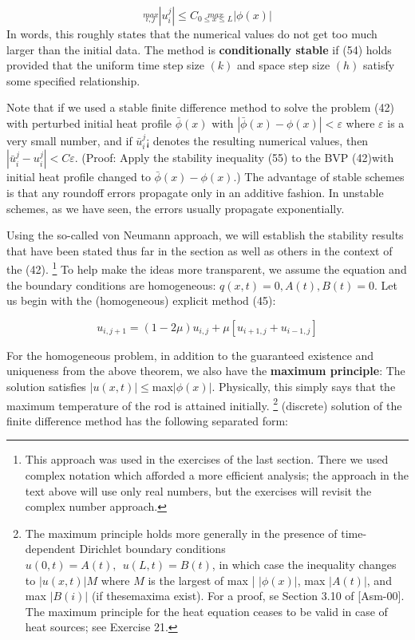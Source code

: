 \documentclass[../main.tex]{subfiles}
\begin{document}
\begin{equation}
 \stackrel{max}{_{i,j}} |u_i^j|\leqslant C \stackrel{max}{_{0\leqslant x \leqslant L}} |\phi(x)|
\end{equation}
In words, this roughly states that the numerical values do not get too much larger than the initial data. The method is \textbf{conditionally stable} if (54) holds provided that the uniform time step size $(k)$ and space step size $(h)$ satisfy some specified relationship.


Note that if we used a stable finite difference method to solve the problem (42) with perturbed initial heat profile $\bar{\phi}(x)$ with $|\bar{\phi}(x) - \phi(x)| < \varepsilon$ where $\varepsilon$ is a very small number, and if $ \bar{u}_i^j$¡ denotes the resulting numerical values, then $|\bar{u}_i^j-u_i^j|<C \varepsilon$. (Proof: Apply the stability inequality (55) to the BVP (42)with initial heat profile changed to $\bar{\phi}(x) - \phi(x)$.) The advantage of stable schemes is that any roundoff errors propagate only in an additive fashion. In unstable schemes, as we have seen, the errors usually propagate exponentially. 


Using the so-called von Neumann approach, we will establish the stability results that have been stated thus far in the section as well as others in the context of the (42).
\footnote{This approach was used in the exercises of the last section. There we used complex notation which afforded a more efficient analysis; the approach in the text above will use only real numbers, but the exercises will revisit the complex number approach.}
To help make the ideas more transparent, we assume the equation and the boundary conditions are homogeneous: $q(x,t) = 0, A(t), B(t) = 0$. Let us begin with the (homogeneous) explicit method (45):

$$u_{i,j+1}=(1-2\mu)u_{i,j}+\mu[u_{i+1,j}+u_{i-1,j}]$$

For the homogeneous problem, in addition to the guaranteed existence and uniqueness from the above theorem, we also have the \textbf{maximum principle}: The solution satisfies 
$|u(x,t)|\leqslant $max$ |\phi(x)| $. 
Physically, this simply says that the maximum temperature of the rod is attained initially.
\footnote{The maximum principle holds more generally in the presence of time-dependent Dirichlet boundary conditions $u(0,t)=A(t),~~u(L,t) =B(t)$, in which case the inequality changes to $|u(x,t)|  M$ where $M$ is the largest of max | $|\phi(x)|$, max $|A(t)|$, and max $| B(i) |$ (if thesemaxima exist). For a proof, se Section 3.10 of [Asm-00]. The maximum principle for the heat equation ceases to be valid in case of heat sources; see Exercise 21.}
(discrete) solution of the finite difference method has the following separated form: 
\end{document}
